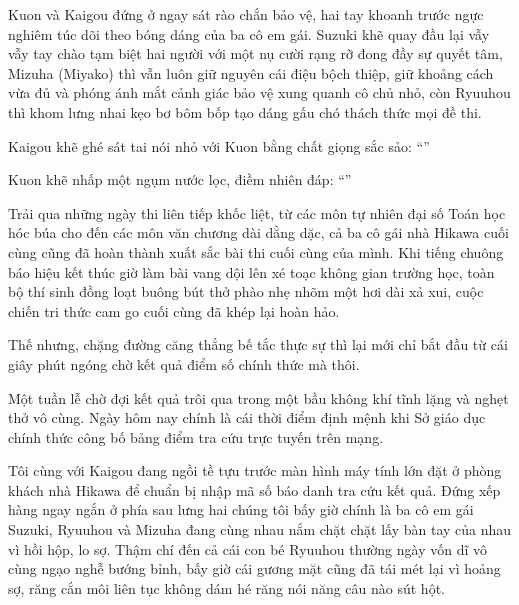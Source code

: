 \documentclass[../main.tex]{subfiles}
\begin{document}
Kuon và Kaigou đứng ở ngay sát rào chắn bảo vệ, hai tay khoanh trước ngực nghiêm túc dõi theo bóng dáng của ba cô em gái. Suzuki khẽ quay đầu lại vẫy vẫy tay chào tạm biệt hai người với một nụ cười rạng rỡ đong đầy sự quyết tâm, Mizuha (Miyako) thì vẫn luôn giữ nguyên cái điệu bộch thiệp, giữ khoảng cách vừa đủ và phóng ánh mắt cảnh giác bảo vệ xung quanh cô chủ nhỏ, còn Ryuuhou thì khom lưng nhai kẹo bơ bôm bốp tạo dáng gấu chó thách thức mọi đề thi.

Kaigou khẽ ghé sát tai nói nhỏ với Kuon bằng chất giọng sắc sảo: ``''

Kuon khẽ nhấp một ngụm nước lọc, điềm nhiên đáp: ``''

Trải qua những ngày thi liên tiếp khốc liệt, từ các môn tự nhiên đại số Toán học hóc búa cho đến các môn văn chương dài dằng dặc, cả ba cô gái nhà Hikawa cuối cùng cũng đã hoàn thành xuất sắc bài thi cuối cùng của mình. Khi tiếng chuông báo hiệu kết thúc giờ làm bài vang dội lên xé toạc không gian trường học, toàn bộ thí sinh đồng loạt buông bút thở phào nhẹ nhõm một hơi dài xả xui, cuộc chiến tri thức cam go cuối cùng đã khép lại hoàn hảo.

Thế nhưng, chặng đường căng thẳng bế tắc thực sự thì lại mới chỉ bắt đầu từ cái giây phút ngóng chờ kết quả điểm số chính thức mà thôi.

\ct


Một tuần lễ chờ đợi kết quả trôi qua trong một bầu không khí tĩnh lặng và nghẹt thở vô cùng. Ngày hôm nay chính là cái thời điểm định mệnh khi Sở giáo dục chính thức công bố bảng điểm tra cứu trực tuyến trên mạng.

Tôi cùng với Kaigou đang ngồi tề tựu trước màn hình máy tính lớn đặt ở phòng khách nhà Hikawa để chuẩn bị nhập mã số báo danh tra cứu kết quả. Đứng xếp hàng ngay ngắn ở phía sau lưng hai chúng tôi bấy giờ chính là ba cô em gái Suzuki, Ryuuhou và Mizuha đang cùng nhau nắm chặt chặt lấy bàn tay của nhau vì hồi hộp, lo sợ. Thậm chí đến cả cái con bé Ryuuhou thường ngày vốn dĩ vô cùng ngạo nghễ bướng bỉnh, bấy giờ cái gương mặt cũng đã tái mét lại vì hoảng sợ, răng cắn môi liên tục không dám hé răng nói năng câu nào sút hột.
\end{document}

